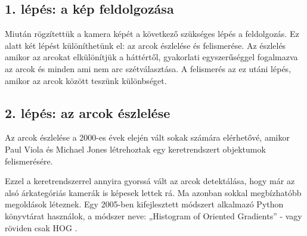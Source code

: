 \subsection{1. lépés: a kép feldolgozása}
Miután rögzítettük a kamera képét a következő szükséges lépés a feldolgozás. Ez alatt két lépést különíthetünk el: az arcok észlelése és felismerése. Az észlelés amikor az arcokat elkülönítjük a háttértől, gyakorlati egyszerűséggel fogalmazva az arcok és minden ami nem arc szétválasztása. A felismerés az ez utáni lépés, amikor az arcok között teszünk különbséget.

\subsection{2. lépés: az arcok észlelése}
Az arcok észlelése a 2000-es évek elején vált sokak számára elérhetővé, amikor Paul Viola és Michael Jones létrehoztak egy keretrendszert \cite{artc33} objektumok felismerésére.

Ezzel a keretrendszerrel annyira gyorssá vált az arcok detektálása, hogy már az alsó árkategóriás kamerák is képesek lettek rá. Ma azonban sokkal megbízhatóbb megoldások léteznek. Egy 2005-ben kifejlesztett módszert alkalmazó Python könyvtárat használok, a módszer neve: „Histogram of Oriented Gradients” - vagy röviden csak HOG \cite{artc34}.

